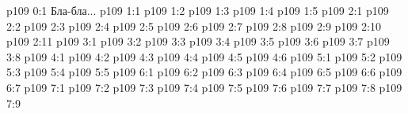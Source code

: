 \author{Одиночный Посланник}
\vs p109 0:1  Бла-бла...
\vs p109 1:1 
\vs p109 1:2 
\vs p109 1:3 
\vs p109 1:4 
\vs p109 1:5 
\vs p109 2:1 
\vs p109 2:2 
\vs p109 2:3 
\vs p109 2:4 
\vs p109 2:5 
\vs p109 2:6 
\vs p109 2:7 
\vs p109 2:8 \pc 
\vs p109 2:9 
\vs p109 2:10 
\vs p109 2:11 
\vs p109 3:1 
\vs p109 3:2 
\vs p109 3:3 
\vs p109 3:4 
\vs p109 3:5 
\vs p109 3:6 
\vs p109 3:7 \pc 
\vs p109 3:8 
\vs p109 4:1 
\vs p109 4:2 
\vs p109 4:3 
\vs p109 4:4 
\vs p109 4:5 \pc 
\vs p109 4:6 
\vs p109 5:1 
\vs p109 5:2 
\vs p109 5:3 
\vs p109 5:4 \pc 
\vs p109 5:5 
\vs p109 6:1 
\vs p109 6:2 
\vs p109 6:3 
\vs p109 6:4 
\vs p109 6:5 
\vs p109 6:6 
\vs p109 6:7 
\vs p109 7:1 
\vs p109 7:2 
\vs p109 7:3 
\vs p109 7:4 
\vs p109 7:5 
\vs p109 7:6 
\vs p109 7:7 \pc 
\vs p109 7:8 \pc 
\vsetoff
\vs p109 7:9 
\quizlink
